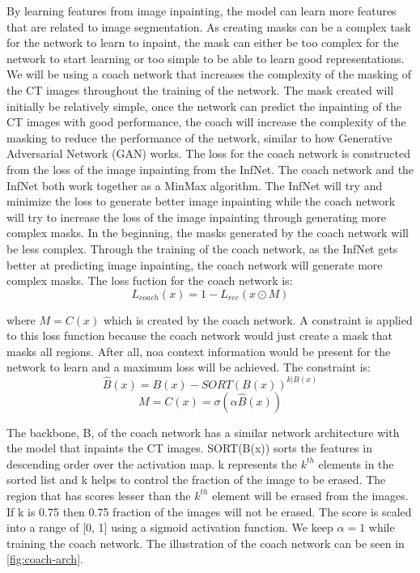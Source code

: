 By learning features from image inpainting, the model can learn more features that are related to image segmentation. As creating masks can be a complex task for the network to learn to inpaint, the mask can either be too complex for the network to start learning or too simple to be able to learn good representations. We will be using a coach network that increases the complexity of the masking of the CT images throughout the training of the network. The mask created will initially be relatively simple, once the network can predict the inpainting of the CT images with good performance, the coach will increase the complexity of the masking to reduce the performance of the network, similar to how Generative Adversarial Network (GAN) works. The loss for the coach network is constructed from the loss of the image inpainting from the InfNet. The coach network and the InfNet both work together as a MinMax algorithm. The InfNet will try and minimize the loss to generate better image inpainting while the coach network will try to increase the loss of the image inpainting through generating more complex masks. In the beginning, the masks generated by the coach network will be less complex. Through the training of the coach network, as the InfNet gets better at predicting image inpainting, the coach network will generate more complex masks. The loss fuction for the coach network is:
\begin{equation}
L_{coach}(x) = 1 - L_{rec}(x\odot M)
\end{equation}

where $M = C(x)$ which is created by the coach network. A constraint is applied to this loss function because the coach network would just create a mask that masks all regions. After all, noa context information would be present for the network to learn and a maximum loss will be achieved. The constraint is:
\begin{equation}
\hat{B}(x) = B(x) - SORT(B(x))^{k|B(x)} 
\end{equation}
\begin{equation}
M = C(x) = \sigma (\alpha \hat{B}(x))
\end{equation}

The backbone, B, of the coach network has a similar network architecture with the model that inpaints the CT images. SORT(B(x)) sorts the features in descending order over the activation map. k represents the $k^{th}$ elements in the sorted list and k helps to control the fraction of the image to be erased. The region that has scores lesser than the $k^{th}$ element will be erased from the images. If k is 0.75 then 0.75 fraction of the images will not be erased. The score is scaled into a range of [0, 1] using a sigmoid activation function. We keep $\alpha = 1$ while training the coach network.
The illustration of the coach network can be seen in \ref{fig:coach-arch}.

